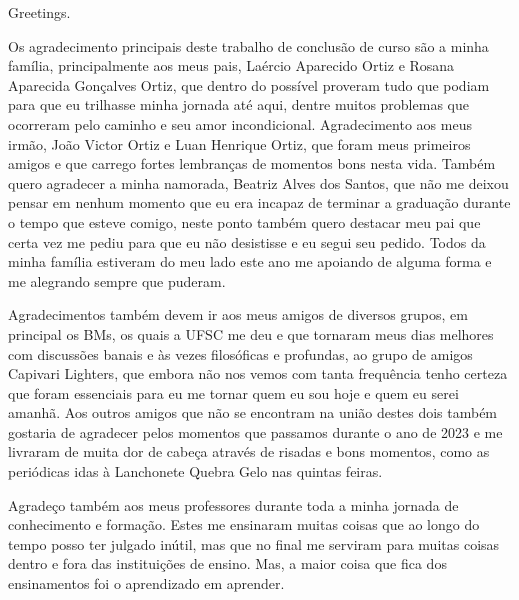 


\begin{agradecimentos}

\lang
{
    Greetings.
}
{
    Os agradecimento principais deste trabalho de conclusão de curso são a minha
    família, principalmente aos meus pais, Laércio Aparecido Ortiz e Rosana
    Aparecida Gonçalves Ortiz, que dentro do possível proveram tudo que podiam
    para que eu trilhasse minha jornada até aqui, dentre muitos problemas que
    ocorreram pelo caminho e seu amor incondicional. Agradecimento aos meus irmão,
    João Victor Ortiz e Luan Henrique Ortiz, que foram meus primeiros amigos e
    que carrego fortes lembranças de momentos bons nesta vida. Também quero agradecer
    a minha namorada, Beatriz Alves dos Santos, que não me deixou pensar em nenhum
    momento que eu era incapaz de terminar a graduação durante o tempo que esteve
    comigo, neste ponto também quero destacar meu pai que certa vez me pediu para que
    eu não desistisse e eu segui seu pedido. Todos da minha família estiveram do meu lado
    este ano me apoiando de alguma forma e me alegrando sempre que puderam.

	Agradecimentos também devem ir aos meus amigos de diversos grupos, em principal os BMs,
    os quais a UFSC me deu e que tornaram meus dias melhores com discussões banais e às
    vezes filosóficas e profundas, ao grupo de amigos Capivari Lighters, que embora não
    nos vemos com tanta frequência tenho certeza que foram essenciais para eu me tornar
    quem eu sou hoje e quem eu serei amanhã. Aos outros amigos que não se encontram na
    união destes dois também gostaria de agradecer pelos momentos que passamos durante o
    ano de 2023 e me livraram de muita dor de cabeça através de risadas e bons momentos,
    como as periódicas idas à Lanchonete Quebra Gelo nas quintas feiras.
	
	Agradeço também aos meus professores durante toda a minha jornada de conhecimento 
	e formação. Estes me ensinaram muitas coisas que ao longo do tempo posso ter julgado
	inútil, mas que no final me serviram para muitas coisas dentro e fora das instituições
	de ensino. Mas, a maior coisa que fica dos ensinamentos foi o aprendizado em aprender.
}
\end{agradecimentos}


%
%
%

